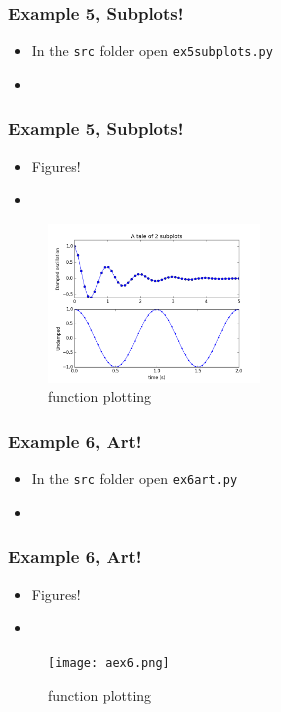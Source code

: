 \documentclass{beamer}
\begin{document}
\begin{frame}
\frametitle{Example 5, Subplots!}
\begin{itemize}
\item In the \texttt{src} folder open \texttt{ex5subplots.py} 
\item
\end{itemize}
\end{frame}

\begin{frame}
\frametitle{Example 5, Subplots!}
\begin{itemize}
\item Figures!
\item
\end{itemize}
\begin{figure}
	\centering
	\includegraphics[width=0.5\textwidth]{ex5.png}
	\caption{function plotting}
	\label{fig:function}
\end{figure}
\end{frame}

\begin{frame}
\frametitle{Example 6, Art!}
\begin{itemize}
\item In the \texttt{src} folder open \texttt{ex6art.py} 
\item
\end{itemize}
\end{frame}

\begin{frame}
\frametitle{Example 6, Art!}
\begin{itemize}
\item Figures!
\item
\end{itemize}
\begin{figure}
	\centering
	\texttt{[image: aex6.png]}
	\caption{function plotting}
	\label{fig:function}
\end{figure}
\end{frame}
\end{document}
